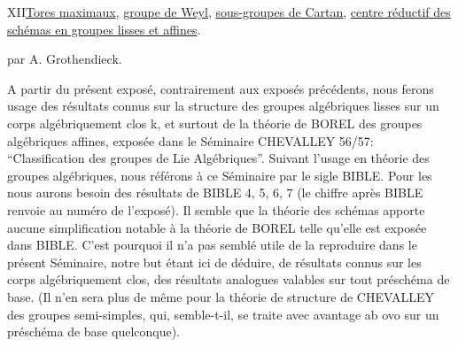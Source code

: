 XII\quad \uline{Tores maximaux}, \uline{groupe de Weyl}, \uline{sous-groupes de Cartan}, \uline{centre
réductif des schémas en groupes lisses et affines}.

par A. Grothendieck.

A partir du présent exposé, contrairement aux exposés précédents,
nous ferons usage des résultats connus sur la structure des groupes
algébriques lisses sur un corps algébriquement clos k, et surtout
de la théorie de BOREL des groupes algébriques affines, exposée dans
le Séminaire CHEVALLEY 56/57:  ``Classification des
groupes de Lie Algébriques''. Suivant l'usage en théorie des groupes
algébriques, nous référons à ce Séminaire par le sigle BIBLE. Pour les
 nous aurons besoin  des résultats de BIBLE 4, 5, 6, 7
(le chiffre après BIBLE renvoie au numéro de l'exposé). Il  semble
 que la théorie des schémas apporte aucune simplification notable
à la théorie  de BOREL  telle qu'elle est exposée
dans BIBLE. C'est pourquoi il n'a pas semblé utile de la reproduire 
 dans le présent Séminaire, notre but étant ici de
déduire, de résultats connus sur les corps algébriquement clos, des
résultats analogues valables sur tout préschéma de base. (Il n'en sera
plus de même pour la théorie de structure de CHEVALLEY des groupes
semi-simples, qui, semble-t-il, se traite avec avantage ab ovo sur un
préschéma de base quelconque).


